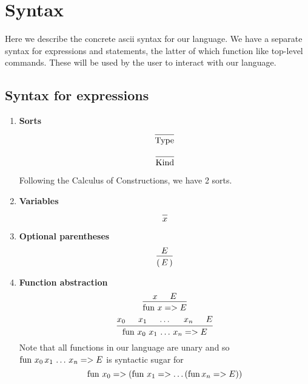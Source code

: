 \documentclass{article}
\begin{document}
\section{Syntax}
Here we describe the concrete ascii syntax for our language.
We have a separate syntax for expressions and statements, the latter of which
function like top-level commands. These will be used by the user to interact
with our language.

\subsection{Syntax for expressions}
\begin{enumerate}
\item \textbf{Sorts} \\
  \[
    \begin{prooftree}
      \infer0{\Type}
    \end{prooftree}
  \]

  \[
    \begin{prooftree}
      \infer0{\Kind}
    \end{prooftree}
  \]

  Following the Calculus of Constructions, we have 2 sorts.

\item \textbf{Variables} \\
  \[
    \begin{prooftree}
      \infer0{x}
    \end{prooftree}
  \]

\item \textbf{Optional parentheses} \\
  \[
    \begin{prooftree}
      \hypo{E}
      \infer1{( \, E \, )}
    \end{prooftree}
  \]
  
\item \textbf{Function abstraction} \\
  \[
    \begin{prooftree}
      \hypo{x}
      \hypo{E}
      \infer2{\fun \, x => E}
    \end{prooftree}
  \]
  \[
    \begin{prooftree}
      \hypo{x_0}
      \hypo{x_1}
      \hypo{\dots}
      \hypo{x_n}
      \hypo{E}
      \infer5{\fun \, x_0 \,\, x_1 \, \dots \, x_n => E}
    \end{prooftree}
  \]
  Note that all functions in our language are unary and so
  $\operatorname{fun} \, x_0 \, x_1 \, \dots \, x_n => E$ is syntactic sugar for
  \[ \operatorname{fun} \, x_0 => (\operatorname{fun} \, x_1 => \dots (\operatorname{fun} x_n => E)) \]


\end{enumerate}
\end{document}
